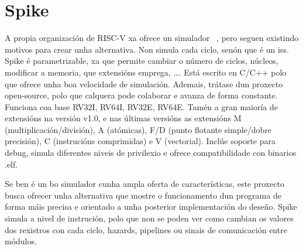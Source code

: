 \section{Spike}\label{sec:spike}
A propia organización de RISC-V xa ofrece un simulador ~\cite{sim_spike}, pero seguen existindo motivos para crear unha alternativa. Non simula cada ciclo, senón que é un \acrfull{iss}. Spike é parametrizable, xa que permite cambiar o número de ciclos, núcleos, modificar a memoria, que extensións emprega, \dots. Está escrito en C/C++ polo que ofrece unha boa velocidade de simulación. Ademais, trátase dun proxecto open-source, polo que calquera pode colaborar e  avanza de forma constante. Funciona coa base RV32I, RV64I, RV32E, RV64E. Tamén a gran maioría de extensións na versión v1.0, e nas últimas versións as extensións M (multiplicación/división), A (atómicas), F/D (punto flotante simple/dobre precisión), C (instrucións comprimidas) e V (vectorial). Inclúe soporte para debug, simula diferentes niveis de privilexio e ofrece compatibilidade con binarios .elf. 

Se ben é un bo simulador cunha ampla oferta de características, este proxecto busca ofrecer unha alternativa que mostre o funcionamento dun programa de forma máis precisa e orientado a unha posterior implementación do deseño. Spike simula a nivel de instrución, polo que non se poden ver como cambian os valores dos rexistros con cada ciclo, hazards, pipelines ou sinais de comunicación entre módulos.

